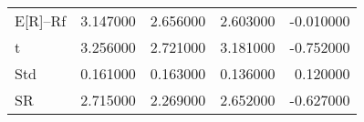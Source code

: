 \begin{tabular}{lrrrr}
\toprule
\midrule
E[R]--Rf & 3.147000 & 2.656000 & 2.603000 & -0.010000 \\
t & 3.256000 & 2.721000 & 3.181000 & -0.752000 \\
Std & 0.161000 & 0.163000 & 0.136000 & 0.120000 \\
SR & 2.715000 & 2.269000 & 2.652000 & -0.627000 \\
\bottomrule
\end{tabular}
